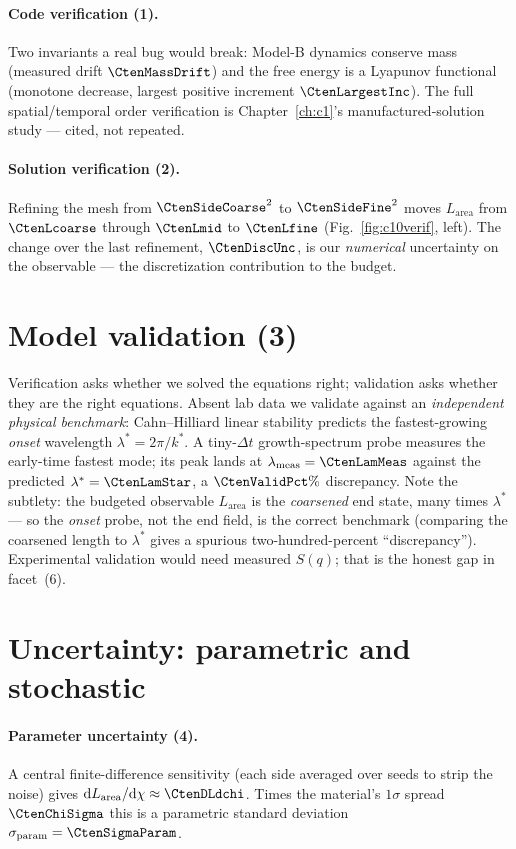\paragraph{Code verification (1).} Two invariants a real bug would break:
Model-B dynamics conserve mass (measured drift $\CtenMassDrift$) and the
free energy is a Lyapunov functional (monotone decrease, largest positive
increment $\CtenLargestInc$). The full spatial/temporal order verification
is Chapter~\ref{ch:c1}'s manufactured-solution study --- cited, not
repeated.

\paragraph{Solution verification (2).} Refining the mesh from
$\CtenSideCoarse^2$ to $\CtenSideFine^2$ moves $L_{\mathrm{area}}$ from
$\CtenLcoarse$ through $\CtenLmid$ to $\CtenLfine$
(Fig.~\ref{fig:c10verif}, left). The change over the last refinement,
$\CtenDiscUnc$, is our \emph{numerical} uncertainty on the observable ---
the discretization contribution to the budget.

\section{Model validation (3)}

Verification asks whether we solved the equations right; validation asks
whether they are the right equations. Absent lab data we validate against
an \emph{independent physical benchmark}: Cahn--Hilliard linear stability
predicts the fastest-growing \emph{onset} wavelength
$\lambda^\ast=2\pi/k^\ast$. A tiny-$\Delta t$ growth-spectrum probe
measures the early-time fastest mode; its peak lands at
$\lambda_{\mathrm{meas}}=\CtenLamMeas$ against the predicted
$\lambda^\ast=\CtenLamStar$, a $\CtenValidPct\%$ discrepancy. Note the
subtlety: the budgeted observable $L_{\mathrm{area}}$ is the
\emph{coarsened} end state, many times $\lambda^\ast$ --- so the
\emph{onset} probe, not the end field, is the correct benchmark
(comparing the coarsened length to $\lambda^\ast$ gives a spurious
two-hundred-percent ``discrepancy''). Experimental validation would need
measured $S(q)$; that is the honest gap in facet~(6).

\section{Uncertainty: parametric and stochastic}

\paragraph{Parameter uncertainty (4).} A central finite-difference
sensitivity (each side averaged over seeds to strip the noise) gives
$\mathrm{d}L_{\mathrm{area}}/\mathrm{d}\chi\approx\CtenDLdchi$. Times the
material's $1\sigma$ spread $\CtenChiSigma$ this is a parametric standard
deviation $\sigma_{\mathrm{param}}=\CtenSigmaParam$.

